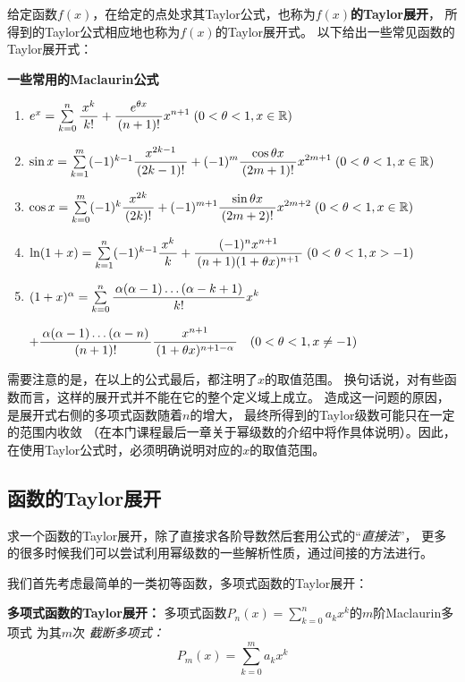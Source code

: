 给定函数$f(x)$，在给定的点处求其Taylor公式，也称为{\bf $f(x)$的Taylor展开}，
所得到的Taylor公式相应地也称为{$f(x)$的Taylor展开式}。
以下给出一些常见函数的Taylor展开式：
\begin{thx}
	{\bf 一些常用的Maclaurin公式}
	\begin{enumerate}[(1)]
	  \item $e^x =\sum\limits_{k=0}^n\displaystyle\frac{\,{x^k}\,}{\,{k!}\,}
	  +\displaystyle\frac{\,{e^{\theta x}}\,}{\,{(n+1)!}\,}x^{n+1}\;
	  (0<\theta<1,x\in\mathbb{R})$
	  \item $\sin x
	  =\sum\limits_{k=1}^m(-1)^{k-1}\displaystyle\frac{\,{x^{2k-1}}\,}{\,{(2k-1)!}\,} 
	  +(-1)^m\displaystyle\frac{\,{\cos\theta x}\,}{\,{(2m+1)!}\,}x^{2m+1}\;
	  (0<\theta<1,x\in\mathbb{R})$
	  \item $\cos x= \sum\limits_{k=0}^m(-1)^{k}\displaystyle\frac{\,{x^{2k}}\,}{\,{(2k)!}\,}
	  +(-1)^{m+1}\displaystyle\frac{\,{\sin\theta
	  x}\,}{\,{(2m+2)!}\,}x^{2m+2}\; (0<\theta<1,x\in\mathbb{R})$
	  \item
	  $\ln(1+x) =\sum\limits_{k=1}^n(-1)^{k-1}\displaystyle\frac{\,{x^k}\,}{\,{k}\,}
	  +\displaystyle\frac{\,{(-1)^nx^{n+1}}\,}{\,{(n+1)(1+\theta
	  x)^{n+1}}\,}\; (0<\theta<1,x>-1)$
	  \item
	  $(1+x)^\alpha =\sum\limits_{k=0}^n
	  \displaystyle\frac{\,{\alpha(\alpha-1)\ldots(\alpha-k+1)}\,}{\,{k!}\,}x^k$

		\hspace{2cm}$+\displaystyle\frac{\,{\alpha(\alpha-1)\ldots(\alpha-n)}\,}{\,{(n+1)!}\,}\displaystyle\frac{\,{x^{n+1}}\,}{\,{(1+\theta
		x)^{n+1-\alpha}}\,}\quad (0<\theta<1,x\ne -1)$
	\end{enumerate}
\end{thx}

需要注意的是，在以上的公式最后，都注明了$x$的取值范围。
换句话说，对有些函数而言，这样的展开式并不能在它的整个定义域上成立。
造成这一问题的原因，是展开式右侧的多项式函数随着$n$的增大，
最终所得到的Taylor级数可能只在一定的范围内收敛
（在本门课程最后一章关于幂级数的介绍中将作具体说明）。因此，
在使用Taylor公式时，必须明确说明对应的$x$的取值范围。	

\subsection{函数的Taylor展开}

求一个函数的Taylor展开，除了直接求各阶导数然后套用公式的“{\it 直接法}”，
更多的很多时候我们可以尝试利用幂级数的一些解析性质，通过间接的方法进行。


我们首先考虑最简单的一类初等函数，多项式函数的Taylor展开：

\begin{thx}
	{\bf 多项式函数的Taylor展开：}
	多项式函数$P_n(x)=\sum\limits_{k=0}^na_kx^k$的$m$阶Maclaurin多项式
	为其$m$次 {\it 截断多项式：} 
	$$P_m(x)=\sum\limits_{k=0}^ma_kx^k$$
\end{thx}

